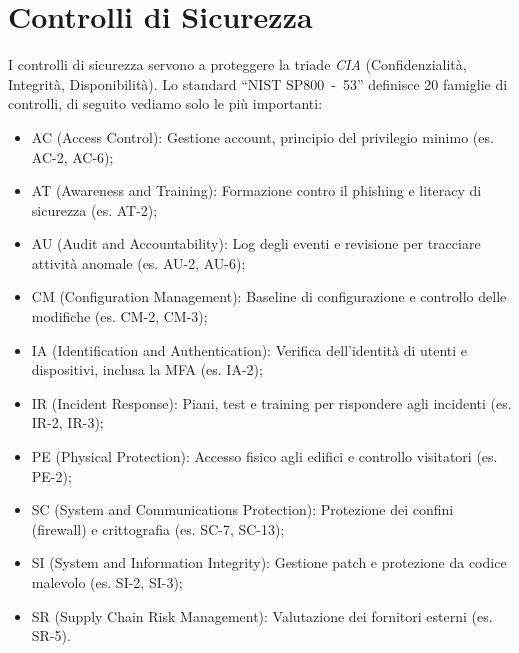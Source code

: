 \section{Controlli di Sicurezza}
I controlli di sicurezza servono a proteggere la triade \emph{CIA} (Confidenzialità, Integrità, Disponibilità). Lo standard ``NIST SP800~-~53'' definisce 20 famiglie di controlli, di seguito vediamo solo le più importanti:
\begin{itemize}
    \item AC (Access Control): Gestione account, principio del privilegio minimo (es. AC-2, AC-6);
    \item AT (Awareness and Training): Formazione contro il phishing e literacy di sicurezza (es. AT-2);
    \item AU (Audit and Accountability): Log degli eventi e revisione per tracciare attività anomale (es. AU-2, AU-6);
    \item CM (Configuration Management): Baseline di configurazione e controllo delle modifiche (es. CM-2, CM-3);
    \item IA (Identification and Authentication): Verifica dell'identità di utenti e dispositivi, inclusa la MFA (es. IA-2);
    \item IR (Incident Response): Piani, test e training per rispondere agli incidenti (es. IR-2, IR-3);
    \item PE (Physical Protection): Accesso fisico agli edifici e controllo visitatori (es. PE-2);
    \item SC (System and Communications Protection): Protezione dei confini (firewall) e crittografia (es. SC-7, SC-13);
    \item SI (System and Information Integrity): Gestione patch e protezione da codice malevolo (es. SI-2, SI-3);
    \item SR (Supply Chain Risk Management): Valutazione dei fornitori esterni (es. SR-5).
\end{itemize}